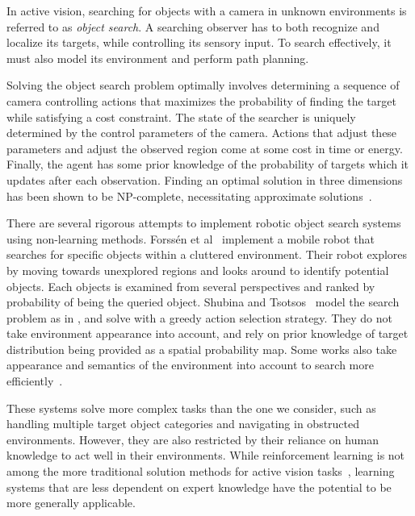 In active vision, searching for objects with a camera in unknown environments is referred to as \textit{object search}.
A searching observer has to both recognize and localize its targets, while controlling its sensory input.
To search effectively, it must also model its environment and perform path planning.~\cite{chen_activevisionsurvey_2011}

Solving the object search problem optimally involves determining a sequence of camera controlling actions that maximizes the probability of finding the target while satisfying a cost constraint.
The state of the searcher is uniquely determined by the control parameters of the camera.
Actions that adjust these parameters and adjust the observed region come at some cost in time or energy.
Finally, the agent has some prior knowledge of the probability of targets which it updates after each observation.
Finding an optimal solution in three dimensions has been shown to be NP-complete, necessitating approximate solutions~\cite{ye_tsotsos_2001}.


There are several rigorous attempts to implement robotic object search systems using non-learning methods.
Forssén et al~\cite{forssen_visual_2008} implement a mobile robot that searches for specific objects within a cluttered environment.
Their robot explores by moving towards unexplored regions and looks around to identify potential objects.
Each objects is examined from several perspectives and ranked by probability of being the queried object.
Shubina and Tsotsos~\cite{shubina_visualsearch_2010} model the search problem as in \cite{ye_tsotsos_2001}, and solve with a greedy action selection strategy.
They do not take environment appearance into account, and rely on prior knowledge of target distribution being provided as a spatial probability map.
Some works also take appearance and semantics of the environment into account to search more efficiently~\cite{aydemir_real_2011,aydemir_active_2013}.

These systems solve more complex tasks than the one we consider, such as handling multiple target object categories and navigating in obstructed environments.
However, they are also restricted by their reliance on human knowledge to act well in their environments.
While reinforcement learning is not among the more traditional solution methods for active vision tasks~\cite{chen_activevisionsurvey_2011},
learning systems that are less dependent on expert knowledge have the potential to be more generally applicable.

